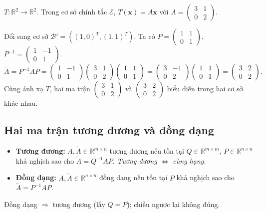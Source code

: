 \documentclass[12pt,a4paper]{article}
\begin{document}
\begin{vidu}[title={Đổi ma trận biểu diễn}]
$T: \mathbb{R}^2 \to \mathbb{R}^2$. Trong cơ sở chính tắc $\mathcal{E}$, $T(\mathbf{x}) = A\mathbf{x}$ với $A = \begin{pmatrix}3 & 1\\ 0 & 2\end{pmatrix}$.

Đổi sang cơ sở $\mathcal{B}' = ((1,0)^T, (1,1)^T)$. Ta có $P = \begin{pmatrix}1&1\\0&1\end{pmatrix}$, $P^{-1} = \begin{pmatrix}1&-1\\0&1\end{pmatrix}$.
\[
  \widetilde{A} = P^{-1} A P = \begin{pmatrix}1&-1\\0&1\end{pmatrix}\begin{pmatrix}3&1\\0&2\end{pmatrix}\begin{pmatrix}1&1\\0&1\end{pmatrix} = \begin{pmatrix}3&-1\\0&2\end{pmatrix}\begin{pmatrix}1&1\\0&1\end{pmatrix} = \begin{pmatrix}3&2\\0&2\end{pmatrix}.
\]
Cùng ánh xạ $T$, hai ma trận $\begin{pmatrix}3&1\\0&2\end{pmatrix}$ và $\begin{pmatrix}3&2\\0&2\end{pmatrix}$ biểu diễn trong hai cơ sở khác nhau.
\end{vidu}

\subsection{Hai ma trận tương đương và đồng dạng}

\begin{dinhnghia}
  \begin{itemize}
    \item \textbf{Tương đương:} $A, \widetilde{A} \in \mathbb{R}^{m\times n}$ tương đương nếu tồn tại $Q \in \mathbb{R}^{m\times m}$, $P \in \mathbb{R}^{n\times n}$ khả nghịch sao cho $\widetilde{A} = Q^{-1}AP$. \emph{Tương đương $\Leftrightarrow$ cùng hạng.}
    \item \textbf{Đồng dạng:} $A, \widetilde{A} \in \mathbb{R}^{n\times n}$ đồng dạng nếu tồn tại $P$ khả nghịch sao cho $\widetilde{A} = P^{-1}AP$.
  \end{itemize}
  Đồng dạng $\Rightarrow$ tương đương (lấy $Q = P$); chiều ngược lại không đúng.
\end{dinhnghia}
\end{document}
